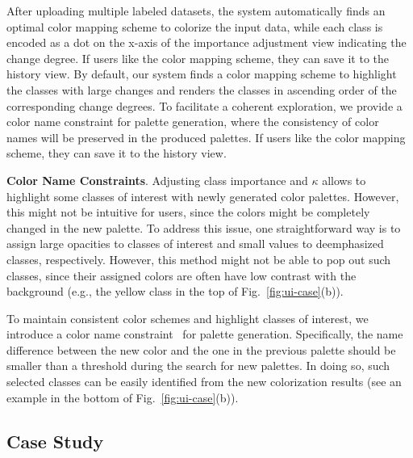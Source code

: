 After uploading multiple labeled datasets, the system automatically finds an optimal color mapping scheme to colorize the input data, while each class is encoded as a dot on the x-axis of the importance adjustment view indicating the change degree. If users like the color mapping scheme, they can save it to the history view. By default, our system finds a color mapping scheme to highlight the classes with large changes and renders the classes in ascending order of the corresponding change degrees. 
To facilitate a coherent exploration, we provide a color name constraint for  palette generation, where the consistency of color names will be preserved in the produced palettes.
If users like the color mapping scheme, they can save it to the history view.









\vspace{1.5mm}
\noindent\textbf{Color Name Constraints}.
Adjusting class importance and $\kappa$  allows to highlight some classes of interest with newly generated color palettes. However, this might not be intuitive for users, since the colors might be completely changed in the new palette. To address this issue,
one straightforward way is to  assign large  opacities  to classes of interest and small values to deemphasized classes, respectively. However, this method might not be able to pop out such classes, since their assigned colors are often have low contrast with the background (e.g., the yellow class in the top of Fig.~\ref{fig:ui-case}(b)).

To maintain consistent color schemes and highlight classes of interest, we introduce a color name constraint~\cite{heer2012color} for palette generation. Specifically, the name difference between the new color and the one in the previous palette should be smaller than a threshold during the search for new palettes.
In doing so, such selected classes can be easily identified from the new colorization results (see an example in the bottom of Fig.~\ref{fig:ui-case}(b)).




\subsection{Case Study}
\label{sec:caseStudy}



